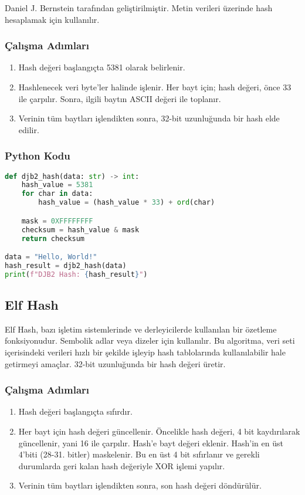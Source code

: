 Daniel J. Bernstein tarafından geliştirilmiştir. Metin verileri üzerinde hash hesaplamak için kullanılır.

\subsubsection{Çalışma Adımları}

\begin{enumerate}
    \item Hash değeri başlangıçta 5381 olarak belirlenir.
    \item Hashlenecek veri byte'ler halinde işlenir. Her bayt için; hash değeri, önce 33 ile çarpılır. Sonra, ilgili baytın ASCII değeri ile toplanır.
    \item Verinin tüm baytları işlendikten sonra, 32-bit uzunluğunda bir hash elde edilir.
\end{enumerate}

\subsubsection{Python Kodu}

\begin{lstlisting}[language=Python]
def djb2_hash(data: str) -> int:
    hash_value = 5381
    for char in data:
        hash_value = (hash_value * 33) + ord(char)

    mask = 0XFFFFFFFF
    checksum = hash_value & mask
    return checksum

data = "Hello, World!"
hash_result = djb2_hash(data)
print(f"DJB2 Hash: {hash_result}")
\end{lstlisting}

\newpage

\subsection{Elf Hash}

Elf Hash, bazı işletim sistemlerinde ve derleyicilerde kullanılan bir özetleme fonksiyonudur. Sembolik adlar veya dizeler için kullanılır. Bu algoritma, veri seti içerisindeki verileri hızlı bir şekilde işleyip hash tablolarında kullanılabilir hale getirmeyi amaçlar. 32-bit uzunluğunda bir hash değeri üretir.

\subsubsection{Çalışma Adımları}

\begin{enumerate}
    \item Hash değeri başlangıçta sıfırdır.
    \item Her bayt için hash değeri güncellenir. Öncelikle hash değeri, 4 bit kaydırılarak güncellenir, yani 16 ile çarpılır. Hash'e bayt değeri eklenir. Hash'in en üst 4'biti (28-31. bitler) maskelenir. Bu en üst 4 bit sıfırlanır ve gerekli durumlarda geri kalan hash değeriyle XOR işlemi yapılır.
    \item Verinin tüm baytları işlendikten sonra, son hash değeri döndürülür.
\end{enumerate}

